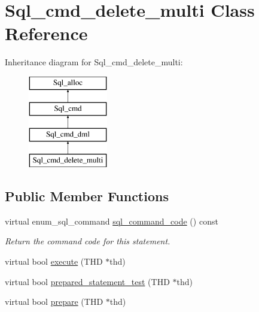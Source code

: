 \hypertarget{classSql__cmd__delete__multi}{}\section{Sql\+\_\+cmd\+\_\+delete\+\_\+multi Class Reference}
\label{classSql__cmd__delete__multi}
Inheritance diagram for Sql\+\_\+cmd\+\_\+delete\+\_\+multi\+:\begin{figure}[H]
\begin{center}
\leavevmode
\includegraphics[height=4.000000cm]{classSql__cmd__delete__multi}
\end{center}
\end{figure}
\subsection*{Public Member Functions}
\begin{DoxyCompactItemize}
\item 
\mbox{\label{classSql__cmd__delete__multi_afc00eae26a51e20282afa9bf491fe457}} 
virtual enum\+\_\+sql\+\_\+command \mbox{\hyperlink{classSql__cmd__delete__multi_afc00eae26a51e20282afa9bf491fe457}{sql\+\_\+command\+\_\+code}} () const
\begin{DoxyCompactList}\small\item\em Return the command code for this statement. \end{DoxyCompactList}\item 
virtual bool \mbox{\hyperlink{classSql__cmd__delete__multi_ac23aab4d1bf9cd9d5c799d2843558810}{execute}} (T\+HD $\ast$thd)
\item 
virtual bool \mbox{\hyperlink{classSql__cmd__delete__multi_a335d296d9f32ec386cfaec2073209d60}{prepared\+\_\+statement\+\_\+test}} (T\+HD $\ast$thd)
\item 
virtual bool \mbox{\hyperlink{classSql__cmd__delete__multi_af069c73c8b62527f3bf8de0b9ce45297}{prepare}} (T\+HD $\ast$thd)
\end{DoxyCompactItemize}

